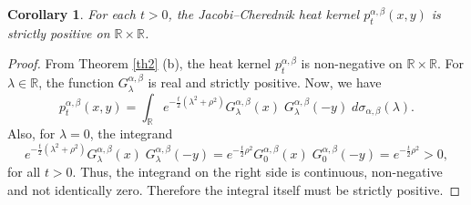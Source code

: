 \documentclass[a4paper,11pt, reqno]{amsart}
\theoremstyle{plain}
\newtheorem{corollary}[theorem]{Corollary}
\theoremstyle{definition}
\theoremstyle{remark}
\def \R{{\mathbb R}}
\def\R{\mathbb R}
\begin{document}
\begin{corollary}
For each $t > 0$, the Jacobi--Cherednik heat kernel $p^{\alpha, \beta}_t(x, y)$ is strictly positive on $\mathbb{R} \times \mathbb{R}$.
\end{corollary}
\begin{proof}
From Theorem \ref{th2} (b), the heat kernel $p^{\alpha, \beta}_t$ is non-negative on $\R \times \R$. For $\lambda \in \R$, the function $G^{\alpha, \beta}_\lambda$ is real and strictly positive. Now, we have
\[ p_t^{\alpha, \beta}(x, y)= \int_{\mathbb{R}} e^{-\frac{t}{2}\left( \lambda^2+\rho^2\right)}  G^{\alpha, \beta}_\lambda(x)\;  G^{\alpha, \beta}_\lambda(-y) \; d\sigma_{\alpha, \beta}(\lambda). \]
Also, for $\lambda = 0$, the integrand  
\[ e^{-\frac{t}{2}\left( \lambda^2+\rho^2\right)}  G^{\alpha, \beta}_\lambda(x)\;  G^{\alpha, \beta}_\lambda(-y)= e^{-\frac{t}{2} \rho^2}  G^{\alpha, \beta}_0(x)\;  G^{\alpha, \beta}_0(-y) = e^{-\frac{t}{2}  \rho^2 } >0,  \]
for all $t>0$. Thus, the integrand on the right side is continuous, non-negative and not identically zero. Therefore the integral itself must be strictly positive. 
\end{proof}  
\end{document}
